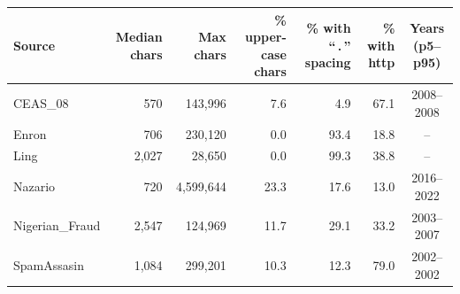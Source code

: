 \begin{tabular}{lrrrrrc}
\toprule
Source & Median chars & Max chars & \% upper-case chars & \% with ``\,.\,'' spacing & \% with http & Years (p5--p95) \\
\midrule
CEAS\_08 & 570 & 143,996 & 7.6 & 4.9 & 67.1 & 2008--2008 \\
Enron & 706 & 230,120 & 0.0 & 93.4 & 18.8 & -- \\
Ling & 2,027 & 28,650 & 0.0 & 99.3 & 38.8 & -- \\
Nazario & 720 & 4,599,644 & 23.3 & 17.6 & 13.0 & 2016--2022 \\
Nigerian\_Fraud & 2,547 & 124,969 & 11.7 & 29.1 & 33.2 & 2003--2007 \\
SpamAssasin & 1,084 & 299,201 & 10.3 & 12.3 & 79.0 & 2002--2002 \\
\bottomrule
\end{tabular}